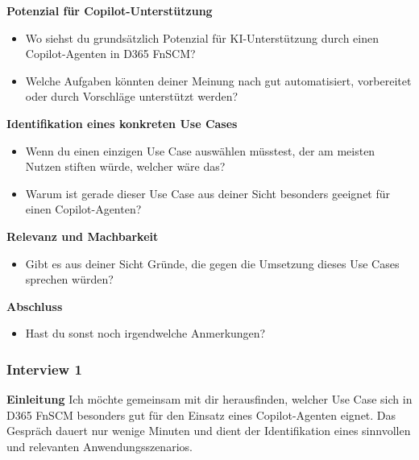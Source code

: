 \vspace{0.5em}

\textbf{Potenzial für Copilot-Unterstützung}

\begin{itemize}
    \item Wo siehst du grundsätzlich Potenzial für KI-Unterstützung durch einen Copilot-Agenten in D365 FnSCM?
    \item Welche Aufgaben könnten deiner Meinung nach gut automatisiert, vorbereitet oder durch Vorschläge unterstützt werden?
\end{itemize}

\vspace{0.5em}

\textbf{Identifikation eines konkreten Use Cases}

\begin{itemize}
    \item Wenn du einen einzigen Use Case auswählen müsstest, der am meisten Nutzen stiften würde, welcher wäre das?
    \item Warum ist gerade dieser Use Case aus deiner Sicht besonders geeignet für einen Copilot-Agenten?
\end{itemize}

\vspace{0.5em}

\textbf{Relevanz und Machbarkeit}

\begin{itemize}
    \item Gibt es aus deiner Sicht Gründe, die gegen die Umsetzung dieses Use Cases sprechen würden?
\end{itemize}

\vspace{0.5em}

\textbf{Abschluss}

\begin{itemize}
    \item Hast du sonst noch irgendwelche Anmerkungen?
\end{itemize}

\subsubsection{Interview 1}
\label{anhang:i1}

\textbf{Einleitung}\newline
Ich möchte gemeinsam mit dir herausfinden, welcher Use Case sich in D365 FnSCM besonders gut für den Einsatz eines Copilot-Agenten eignet.
Das Gespräch dauert nur wenige Minuten und dient der Identifikation eines sinnvollen und relevanten Anwendungsszenarios.

